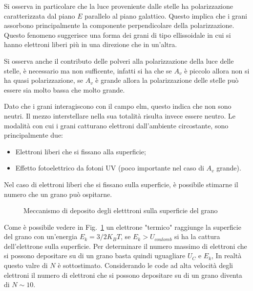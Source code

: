 Si osserva in particolare che la luce proveniente dalle stelle ha polarizzazione caratterizzata dal piano $E$ parallelo al piano galattico. Questo implica che i grani assorbono principalmente la componente perpendicolare della polarizzazione. Questo fenomeno suggerisce una forma dei grani di tipo ellissoidale in cui si hanno elettroni liberi pi\`u in una direzione che in un'altra.

Si osserva anche il contributo delle polveri alla polarizzazione della luce delle stelle, \`e necessario ma non sufficente, infatti si ha che se $A_v$ \`e piccolo allora non si ha quasi polarizzazione, se $A_v$ \`e grande allora la polarizzazione delle stelle pu\`o essere sia molto bassa che molto grande.

Dato che i grani interagiscono con il campo elm, questo indica che non sono neutri. Il mezzo interstellare nella sua totalit\`a risulta invece essere neutro. Le modalit\`a con cui i grani catturano elettroni dall'ambiente circostante, sono principalmente due:
\begin{itemize}
		\item Elettroni liberi che si fissano alla superficie;
		\item Effetto fotoelettrico da fotoni UV (poco importante nel caso di $A_v$ grande).
\end{itemize}

Nel caso di elettroni liberi che si fissano sulla superficie, \`e possibile stimarne il numero che un grano pu\`o ospitarne.
\begin{figure}
		\centering
		\caption{Meccanismo di deposito degli eletttroni sulla superficie del grano}
		\label{GRANO:EL}
\end{figure}
Come \`e possibile vedere in Fig.~\ref{GRANO:EL} un elettrone "termico" raggiunge la superficie del grano con un'energia $E_k=3/2 K_B T$, se $E_k > U_{coulomb}$ si ha la cattura dell'elettrone sulla superficie. Per determinare il numero massimo di elettroni che si possono depositare su di un grano basta quindi uguagliare $U_C$ e $E_k$,
In realt\`a questo valre di $N$ \`e sottostimato. Considerando le code ad alta velocit\`a degli elettroni il numero di elettroni che si possono depositare su di un grano diventa di $N\sim10$.


